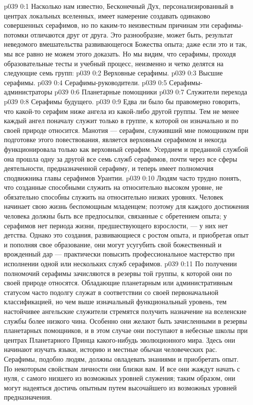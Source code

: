 \author{Мелхиседек}
\vs p039 0:1 Насколько нам известно, Бесконечный Дух, персонализированный в центрах локальных вселенных, имеет намерение создавать одинаково совершенных серафимов, но по каким\hyp{}то неизвестным причинам эти серафимы\hyp{}потомки отличаются друг от друга. Это разнообразие, может быть, результат неведомого вмешательства развивающегося Божества опыта; даже если это и так, мы все равно не можем этого доказать. Но мы видим, что серафимы, проходя образовательные тесты и учебный процесс, неизменно и четко делятся на следующие семь групп:
\vs p039 0:2 \bibnobreakspace Верховные серафимы.
\vs p039 0:3 \bibnobreakspace Высшие серафимы.
\vs p039 0:4 \bibnobreakspace Серафимы\hyp{}руководители.
\vs p039 0:5 \bibnobreakspace Серафимы\hyp{}администраторы
\vs p039 0:6 \bibnobreakspace Планетарные помощники
\vs p039 0:7 \bibnobreakspace Служители перехода
\vs p039 0:8 \bibnobreakspace Серафимы будущего.
\vs p039 0:9 \pc Едва ли было бы правомерно говорить, что какой\hyp{}то серафим ниже ангела из какой\hyp{}либо другой группы. Тем не менее каждый ангел поначалу служит только в группе, к которой он изначально и по своей природе относится. Манотия --- серафим, служивший мне помощником при подготовке этого повествования, является верховным серафимом и некогда функционировала только как верховный серафим. Усердием и преданной службой она прошла одну за другой все семь служб серафимов, почти через все сферы деятельности, предназначенной серафиму, и теперь имеет полномочия сподвижника главы серафимов Урантии.
\vs p039 0:10 Людям часто трудно понять, что созданные способными служить на относительно высоком уровне, не обязательно способны служить на относительно низких уровнях. Человек начинает свою жизнь беспомощным младенцем; поэтому для каждого достижения человека должны быть все предпосылки, связанные с обретением опыта; у серафимов нет периода жизни, предшествующего взрослости, --- у них нет детства. Однако это создания, развивающиеся с ростом опыта, и приобретая опыт и пополняя свое образование, они могут усугубить свой божественный и врожденный дар --- практически повысить профессиональное мастерство при исполнении одной или нескольких служб серафимов.
\vs p039 0:11 По получении полномочий серафимы зачисляются в резервы той группы, к которой они по своей природе относятся. Обладающие планетарным или административным статусом часто подолгу служат в соответствии со своей первоначальной классификацией, но чем выше изначальный функциональный уровень, тем настойчивее ангельские служители стремятся получить назначение на вселенские службы более низкого чина. Особенно они желают быть зачисленными в резервы планетарных помощников, и в этом случае они поступают в небесные школы при центрах Планетарного Принца какого\hyp{}нибудь эволюционного мира. Здесь они начинают изучать языки, историю и местные обычаи человеческих рас. Серафимы, подобно людям, должны овладевать знаниями и приобретать опыт. По некоторым свойствам личности они близки вам. И все они жаждут начать с нуля, с самого низшего из возможных уровней служения; таким образом, они могут надеяться достичь опытным путем высочайшего из возможных уровней предназначения.
